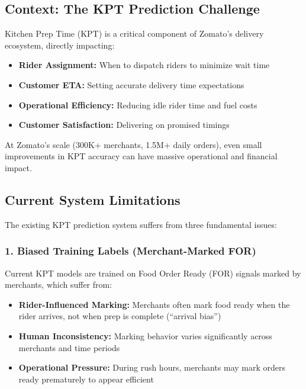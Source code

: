 \documentclass[11pt,a4paper]{article}
\begin{document}
\subsection{Context: The KPT Prediction Challenge}

Kitchen Prep Time (KPT) is a critical component of Zomato's delivery ecosystem, directly impacting:

\begin{itemize}[leftmargin=*]
    \item \textbf{Rider Assignment:} When to dispatch riders to minimize wait time
    \item \textbf{Customer ETA:} Setting accurate delivery time expectations
    \item \textbf{Operational Efficiency:} Reducing idle rider time and fuel costs
    \item \textbf{Customer Satisfaction:} Delivering on promised timings
\end{itemize}

At Zomato's scale (300K+ merchants, 1.5M+ daily orders), even small improvements in KPT accuracy can have massive operational and financial impact.

\subsection{Current System Limitations}

The existing KPT prediction system suffers from three fundamental issues:

\subsubsection{1. Biased Training Labels (Merchant-Marked FOR)}

Current KPT models are trained on Food Order Ready (FOR) signals marked by merchants, which suffer from:

\begin{itemize}[leftmargin=*]
    \item \textbf{Rider-Influenced Marking:} Merchants often mark food ready when the rider arrives, not when prep is complete (``arrival bias'')
    \item \textbf{Human Inconsistency:} Marking behavior varies significantly across merchants and time periods
    \item \textbf{Operational Pressure:} During rush hours, merchants may mark orders ready prematurely to appear efficient
\end{itemize}
\end{document}
